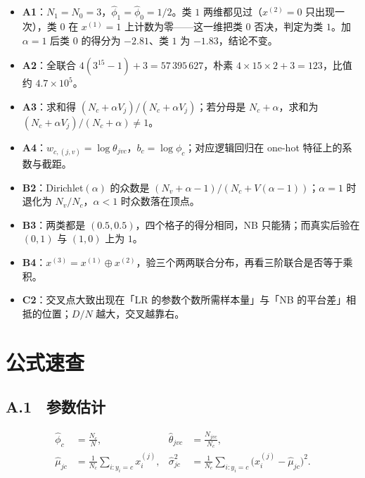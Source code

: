 \documentclass[11pt,a4paper,fontset=windows,zihao=-4]{ctexart}
\begin{document}
\begin{itemize}[itemsep=0.2em]
  \item \textbf{A1}：$N_1=N_0=3$，$\hat\phi_1=\hat\phi_0=1/2$。类 $1$ 两维都见过（$x^{(2)}=0$ 只出现一次），类 $0$ 在 $x^{(1)}=1$ 上计数为零——这一维把类 $0$ 否决，判定为类 $1$。加 $\alpha=1$ 后类 $0$ 的得分为 $-2.81$、类 $1$ 为 $-1.83$，结论不变。
  \item \textbf{A2}：全联合 $4(3^{15}-1)+3=57\,395\,627$，朴素 $4\times15\times2+3=123$，比值约 $4.7\times10^{5}$。
  \item \textbf{A3}：求和得 $(N_c+\alpha V_j)/(N_c+\alpha V_j)$；若分母是 $N_c+\alpha$，求和为 $(N_c+\alpha V_j)/(N_c+\alpha)\ne1$。
  \item \textbf{A4}：$w_{c,(j,v)}=\log\theta_{jvc}$，$b_c=\log\phi_c$；对应逻辑回归在 one-hot 特征上的系数与截距。
  \item \textbf{B2}：Dirichlet$(\alpha)$ 的众数是 $(N_v+\alpha-1)/(N_c+V(\alpha-1))$；$\alpha=1$ 时退化为 $N_v/N_c$，$\alpha<1$ 时众数落在顶点。
  \item \textbf{B3}：两类都是 $(0.5,0.5)$，四个格子的得分相同，NB 只能猜；而真实后验在 $(0,1)$ 与 $(1,0)$ 上为 $1$。
  \item \textbf{B4}：$x^{(3)}=x^{(1)}\oplus x^{(2)}$，验三个两两联合分布，再看三阶联合是否等于乘积。
  \item \textbf{C2}：交叉点大致出现在「LR 的参数个数所需样本量」与「NB 的平台差」相抵的位置；$D/N$ 越大，交叉越靠右。
\end{itemize}


\appendix
\renewcommand{\thesection}{\Alph{section}}

\section{公式速查}

\subsection*{A.1　参数估计}

\begin{align}
  \hat\phi_c&=\frac{N_c}{N},&
  \hat\theta_{jvc}&=\frac{N_{jvc}}{N_c},\\
  \hat\mu_{jc}&=\frac{1}{N_c}\sum_{i:y_i=c}x_i^{(j)},&
  \hat\sigma_{jc}^2&=\frac{1}{N_c}\sum_{i:y_i=c}\bigl(x_i^{(j)}-\hat\mu_{jc}\bigr)^2 .
\end{align}
\end{document}
